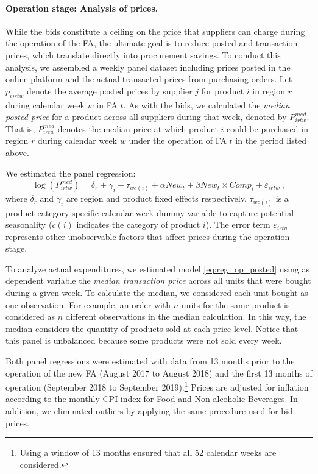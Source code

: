 \paragraph{Operation stage: Analysis of prices.}
While the bids constitute a ceiling on the price that suppliers can charge during the operation of the FA, the ultimate goal is to reduce posted and transaction prices, which translate directly into procurement savings. To conduct this analysis, we assembled a weekly panel dataset including prices posted in the online platform and the actual transacted prices from purchasing orders. Let $p_{ijrtw}$ denote the average posted prices by supplier $j$ for product $i$ in region $r$ during calendar week $w$ in FA $t$. As with the bids, we calculated the {\em median posted price} for a product across all suppliers during that week, denoted by $P^{med}_{irtw}$. That is, $P^{med}_{irtw}$ denotes the median price at which product $i$ could be purchased in region $r$ during calendar week $w$ under the operation of FA $t$ in the period listed above. 

We estimated the panel regression:
\begin{equation}
    \log (P^{med}_{irtw})= \delta_r + \gamma_i + \tau_{wc(i)} + \alpha New_{t} + \beta New_{t}\times Comp_{i} + \varepsilon_{irtw} \ ,
    \label{eq:reg_op_posted}
\end{equation}
\noindent where $\delta_r$ and $\gamma_i$ are region and product fixed effects respectively, $\tau_{wc(i)}$ is a product category-specific calendar week dummy variable to capture potential seasonality ($c(i)$ indicates the category of product $i$). {The error term $\varepsilon_{irtw}$ represents other unobservable factors that affect prices during the operation stage.}


To analyze actual expenditures, we estimated model \eqref{eq:reg_op_posted} using as dependent variable the \emph{median transaction price} across all units that were bought during a given week. To calculate the median, we considered each unit bought as one observation. For example, an order with $n$ units for the same product is considered as $n$ different observations in the median calculation. In this way, the median considers the quantity of products sold at each price level. Notice that this panel is unbalanced because some products were not sold  every week.

Both panel regressions were estimated with data from 13 months prior to the operation of the new FA (August 2017 to August 2018) and the first 13 months of operation (September 2018 to September 2019).\footnote{Using a window of 13 months ensured that all 52 calendar weeks are considered.} Prices are adjusted for inflation according to the monthly CPI index for Food and Non-alcoholic Beverages. In addition, we eliminated outliers by applying the same procedure used for bid prices.

